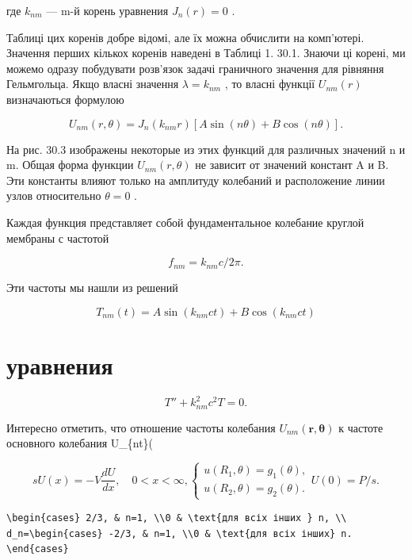 \documentclass[
  ukrainian,
]{article}
\begin{document}
где \(k_{nm}\) --- m-й корень уравнения \(J_n(r) = 0\) .

Таблиці цих коренів добре відомі, але їх можна обчислити на комп'ютері.
Значення перших кількох коренів наведені в Таблиці 1. 30.1. Знаючи ці
корені, ми можемо одразу побудувати розв'язок задачі граничного значення
для рівняння Гельмгольца. Якщо власні значення \(\lambda = k_{nm}\) , то
власні функції \(U_{ nm}(r)\) визначаються формулою

\[
U_{nm}(r, \theta) = J_n(k_{nm}r) [A \sin(n\theta) + B \cos(n\theta)].
\]

На рис. 30.3 изображены некоторые из этих функций для различных значений
n и m. Общая форма функции \(U_{nm}(r,\theta)\) не зависит от значений
констант A и B. Эти константы влияют только на амплитуду колебаний и
расположение линии узлов относительно \(\theta=0\) .

Каждая функция представляет собой фундаментальное колебание круглой
мембраны с частотой

\[
f_{nm} = k_{nm}c/2\pi.
\]

Эти частоты мы нашли из решений

\[
T_{nm}(t) = A \sin(k_{nm}ct) + B \cos(k_{nm}ct)
\]

\section{уравнения}\label{ux443ux440ux430ux432ux43dux435ux43dux438ux44f}

\[
T'' + k_{nm}^2 c^2 T = 0.
\]

Интересно отметить, что отношение частоты колебания
\(U_{nm}(\mathbf{r}, \mathbf{\theta})\) к частоте основного колебания
U\_\{nt\}(\ma

\[
sU(x) = -V \frac{dU}{dx}, \quad 0 < x < \infty,
\begin{cases} u(R_1, \theta) = g_1(\theta), \\ u(R_2, \theta) = g_2(\theta). \end{cases}
U(0) = P/s.
\]

\begin{verbatim}
\begin{cases} 2/3, & n=1, \\0 & \text{для всіх інших } n, \\ d_n=\begin{cases} -2/3, & n=1, \\0 & \text{для всіх інших} n. \end{cases}
\end{verbatim}
\end{document}
